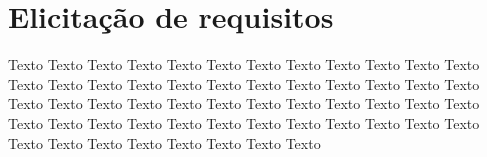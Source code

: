 \chapter{Elicitação de requisitos}

  Texto Texto Texto Texto Texto Texto Texto Texto Texto Texto Texto Texto Texto Texto
  Texto Texto Texto Texto Texto Texto Texto Texto Texto Texto Texto Texto Texto Texto
  Texto Texto Texto Texto Texto Texto Texto Texto Texto Texto Texto Texto Texto Texto
  Texto Texto Texto Texto Texto Texto Texto Texto Texto Texto Texto Texto Texto Texto

